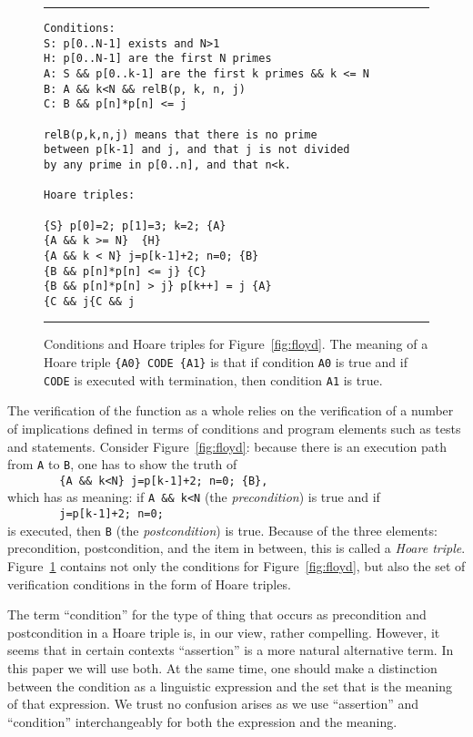 \documentclass[preprint,11pt]{elsarticle}
\begin{document}
\begin{figure}[htbp]
\hrule
\vspace{0.1in}
\begin{center}
\begin{minipage}[t]{3in}
{\footnotesize
\begin{verbatim}
Conditions:
S: p[0..N-1] exists and N>1
H: p[0..N-1] are the first N primes
A: S && p[0..k-1] are the first k primes && k <= N
B: A && k<N && relB(p, k, n, j)
C: B && p[n]*p[n] <= j

relB(p,k,n,j) means that there is no prime
between p[k-1] and j, and that j is not divided
by any prime in p[0..n], and that n<k.

Hoare triples:

{S} p[0]=2; p[1]=3; k=2; {A}
{A && k >= N}  {H}
{A && k < N} j=p[k-1]+2; n=0; {B}
{B && p[n]*p[n] <= j} {C} 
{B && p[n]*p[n] > j} p[k++] = j {A}
{C && j{C && j\end{verbatim}
} \end{minipage}
\end{center}
\caption{\label{fig:verification}
Conditions and Hoare triples for Figure~\ref{fig:floyd}.
The meaning of a Hoare triple {\tt \{A0\} CODE \{A1\}}
is that if condition {\tt A0} is true
and if {\tt CODE} is executed
with termination, then condition {\tt A1} is true.
}
\vspace{0.1in}
\hrule
\end{figure}

The verification of the function as a whole
relies on the verification of a number of
implications defined in terms of conditions
and program elements such as tests and statements.
Consider Figure~\ref{fig:floyd}:
because there is an execution path
from \verb+A+ to \verb+B+, one has to show
the truth of\\
\verb"        {A && k<N} j=p[k-1]+2; n=0; {B},"\\
which has as meaning:
if \verb"A && k<N" (the \emph{precondition}) is true
and if\\
\verb"        j=p[k-1]+2; n=0;"\\
is executed, then \verb"B" (the \emph{postcondition})
is true.
Because of the three elements: precondition,
postcondition, and the item in between,
this is called a \emph{Hoare triple}.
Figure~\ref{fig:verification} contains not only
the conditions for Figure~\ref{fig:floyd},
but also the set of verification conditions
in the form of Hoare triples.

The term ``condition'' for the type of thing
that occurs as precondition and postcondition
in a Hoare triple is, in our view, rather compelling.
However, it seems that in certain contexts
``assertion'' is a more natural alternative term.
In this paper we will use both.
At the same time, one should make a distinction
between the condition as a linguistic expression
and the set that is the meaning of that expression.
We trust no confusion arises as we
use ``assertion'' and ``condition''
interchangeably for both the expression and the meaning.
\end{document}
